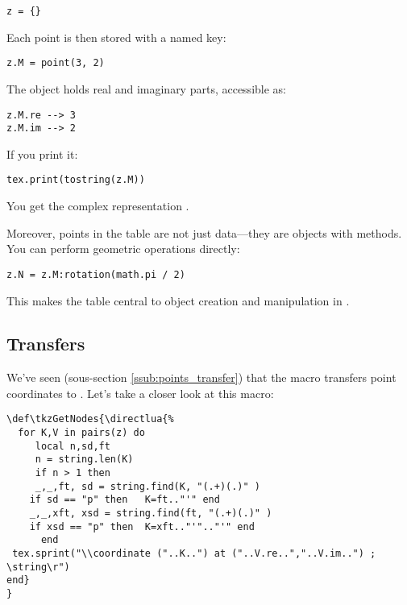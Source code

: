 \begin{verbatim}
z = {}
\end{verbatim}

Each point is then stored with a named key:

\begin{mybox}
\begin{verbatim}
z.M = point(3, 2)
\end{verbatim}
\end{mybox}

The object  holds real and imaginary parts, accessible as:

\begin{verbatim}
z.M.re --> 3
z.M.im --> 2
\end{verbatim}

If you print it:

\begin{verbatim}
tex.print(tostring(z.M))
\end{verbatim}

You get the complex representation .

Moreover, points in the  table are not just data—they are objects with methods. You can perform geometric operations directly:

\begin{verbatim}
z.N = z.M:rotation(math.pi / 2)
\end{verbatim}

This makes the  table central to object creation and manipulation in .

\subsection{Transfers} %
\label{sub:transfers}

We've seen (sous-section \ref{ssub:points_transfer}) that the macro  transfers point coordinates to \TIKZ. Let's take a closer look at this macro:

\vspace*{1em}

\begin{mybox}
\begin{verbatim}
\def\tkzGetNodes{\directlua{%
  for K,V in pairs(z) do
     local n,sd,ft
     n = string.len(K)
     if n > 1 then
     _,_,ft, sd = string.find(K, "(.+)(.)" )  
    if sd == "p" then   K=ft.."'" end
    _,_,xft, xsd = string.find(ft, "(.+)(.)" )
    if xsd == "p" then  K=xft.."'".."'" end
      end    
 tex.sprint("\\coordinate ("..K..") at ("..V.re..","..V.im..") ; \string\r")
end}
}  
\end{verbatim}
\end{mybox}

